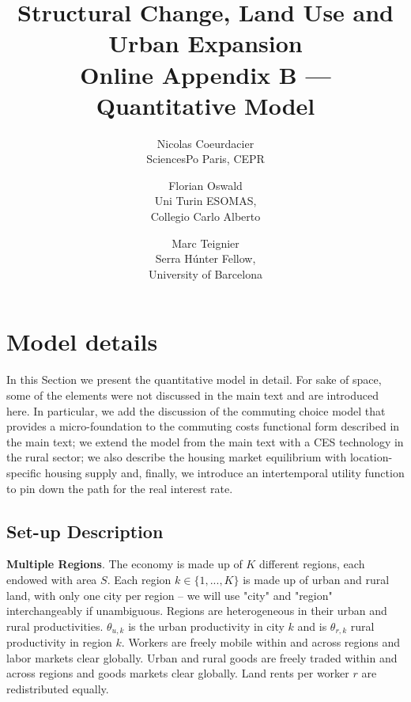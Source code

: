 \documentclass[11pt]{report}
\begin{document}
	

\title{Structural Change, Land Use and Urban Expansion\\Online Appendix B --- Quantitative Model}
\author{%
	Nicolas Coeurdacier\\ \small SciencesPo Paris, CEPR
	\and Florian Oswald\\ \small Uni Turin ESOMAS,\\\small Collegio Carlo Alberto
	\and Marc Teignier\\ \small Serra Húnter Fellow, \\\small University of Barcelona
}

\maketitle

{}

\tableofcontents

\newpage
\section{Model details}\label{B-sec:Qmodel}

In this Section we present the quantitative model in detail. For sake of space, some of the elements were not discussed in the main text and are introduced here. In particular, we add the discussion of the commuting choice model that provides a micro-foundation to the commuting costs functional form described in the main text; we extend the model from the main text with a CES technology in the rural sector; we also describe the housing market equilibrium with location-specific housing supply and, finally, we introduce an intertemporal utility function to pin down the path for the real interest rate.  

\subsection{Set-up Description}

\noindent \textbf{Multiple Regions}. The economy is made up of $K$ different regions, each endowed with area $S$. Each region $k \in \{1,..., K\}$ is made up of urban and rural land, with only one city per region -- we will use "city" and "region" interchangeably if unambiguous. Regions are heterogeneous in their urban and rural productivities. $\theta_{u,k}$ is the urban productivity in city $k$ and is $\theta_{r,k}$ rural productivity in region $k$. Workers are freely mobile within and across regions and labor markets clear globally. Urban and rural goods are freely traded within and across regions and goods markets clear globally. Land rents per worker $r$ are redistributed equally.
\end{document}

